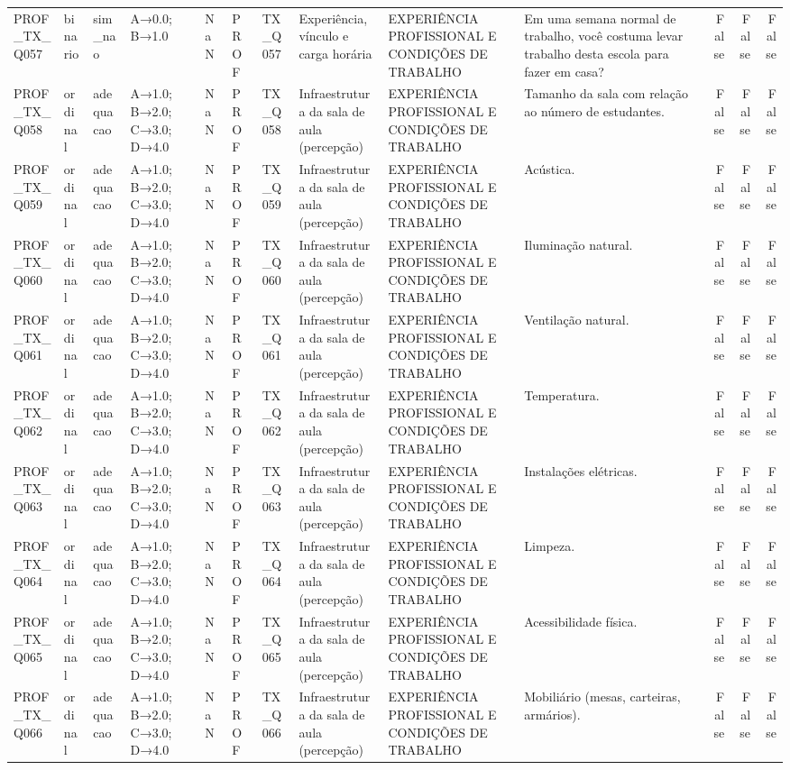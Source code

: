 \begin{tabular}{llllllllllrrr}
PROF\_TX\_Q057 & binario & sim\_nao & A→0.0; B→1.0 & NaN & PROF & TX\_Q057 & Experiência, vínculo e carga horária & EXPERIÊNCIA PROFISSIONAL E CONDIÇÕES DE TRABALHO & Em uma semana normal de trabalho, você costuma levar trabalho desta escola para fazer em casa? & False & False & False \\
PROF\_TX\_Q058 & ordinal & adequacao & A→1.0; B→2.0; C→3.0; D→4.0 & NaN & PROF & TX\_Q058 & Infraestrutura da sala de aula (percepção) & EXPERIÊNCIA PROFISSIONAL E CONDIÇÕES DE TRABALHO & Tamanho da sala com relação ao número de estudantes. & False & False & False \\
PROF\_TX\_Q059 & ordinal & adequacao & A→1.0; B→2.0; C→3.0; D→4.0 & NaN & PROF & TX\_Q059 & Infraestrutura da sala de aula (percepção) & EXPERIÊNCIA PROFISSIONAL E CONDIÇÕES DE TRABALHO & Acústica. & False & False & False \\
PROF\_TX\_Q060 & ordinal & adequacao & A→1.0; B→2.0; C→3.0; D→4.0 & NaN & PROF & TX\_Q060 & Infraestrutura da sala de aula (percepção) & EXPERIÊNCIA PROFISSIONAL E CONDIÇÕES DE TRABALHO & Iluminação natural. & False & False & False \\
PROF\_TX\_Q061 & ordinal & adequacao & A→1.0; B→2.0; C→3.0; D→4.0 & NaN & PROF & TX\_Q061 & Infraestrutura da sala de aula (percepção) & EXPERIÊNCIA PROFISSIONAL E CONDIÇÕES DE TRABALHO & Ventilação natural. & False & False & False \\
PROF\_TX\_Q062 & ordinal & adequacao & A→1.0; B→2.0; C→3.0; D→4.0 & NaN & PROF & TX\_Q062 & Infraestrutura da sala de aula (percepção) & EXPERIÊNCIA PROFISSIONAL E CONDIÇÕES DE TRABALHO & Temperatura. & False & False & False \\
PROF\_TX\_Q063 & ordinal & adequacao & A→1.0; B→2.0; C→3.0; D→4.0 & NaN & PROF & TX\_Q063 & Infraestrutura da sala de aula (percepção) & EXPERIÊNCIA PROFISSIONAL E CONDIÇÕES DE TRABALHO & Instalações elétricas. & False & False & False \\
PROF\_TX\_Q064 & ordinal & adequacao & A→1.0; B→2.0; C→3.0; D→4.0 & NaN & PROF & TX\_Q064 & Infraestrutura da sala de aula (percepção) & EXPERIÊNCIA PROFISSIONAL E CONDIÇÕES DE TRABALHO & Limpeza. & False & False & False \\
PROF\_TX\_Q065 & ordinal & adequacao & A→1.0; B→2.0; C→3.0; D→4.0 & NaN & PROF & TX\_Q065 & Infraestrutura da sala de aula (percepção) & EXPERIÊNCIA PROFISSIONAL E CONDIÇÕES DE TRABALHO & Acessibilidade física. & False & False & False \\
PROF\_TX\_Q066 & ordinal & adequacao & A→1.0; B→2.0; C→3.0; D→4.0 & NaN & PROF & TX\_Q066 & Infraestrutura da sala de aula (percepção) & EXPERIÊNCIA PROFISSIONAL E CONDIÇÕES DE TRABALHO & Mobiliário (mesas, carteiras, armários). & False & False & False \\

\end{tabular}
